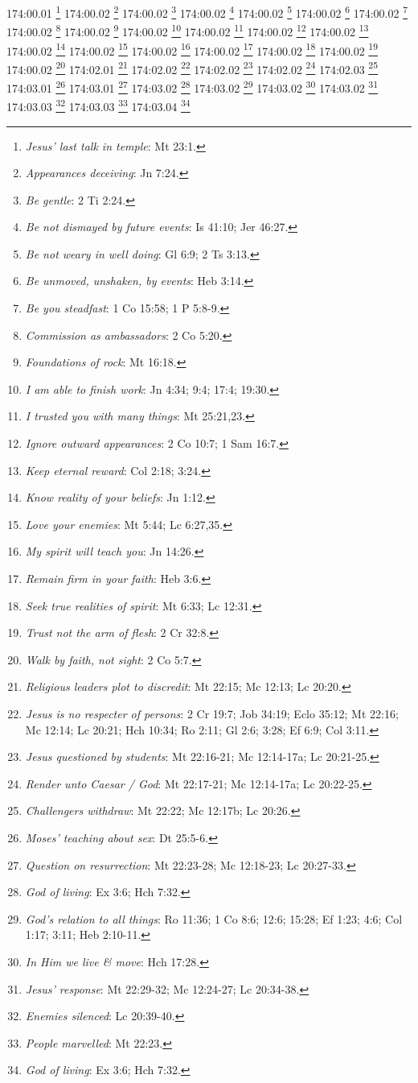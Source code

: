 174:00.01 \footnote{\textit{Jesus' last talk in temple}: Mt 23:1.}
174:00.02 \footnote{\textit{Appearances deceiving}: Jn 7:24.}
174:00.02 \footnote{\textit{Be gentle}: 2 Ti 2:24.}
174:00.02 \footnote{\textit{Be not dismayed by future events}: Is 41:10; Jer 46:27.}
174:00.02 \footnote{\textit{Be not weary in well doing}: Gl 6:9; 2 Ts 3:13.}
174:00.02 \footnote{\textit{Be unmoved, unshaken, by events}: Heb 3:14.}
174:00.02 \footnote{\textit{Be you steadfast}: 1 Co 15:58; 1 P 5:8-9.}
174:00.02 \footnote{\textit{Commission as ambassadors}: 2 Co 5:20.}
174:00.02 \footnote{\textit{Foundations of rock}: Mt 16:18.}
174:00.02 \footnote{\textit{I am able to finish work}: Jn 4:34; 9:4; 17:4; 19:30.}
174:00.02 \footnote{\textit{I trusted you with many things}: Mt 25:21,23.}
174:00.02 \footnote{\textit{Ignore outward appearances}: 2 Co 10:7; 1 Sam 16:7.}
174:00.02 \footnote{\textit{Keep eternal reward}: Col 2:18; 3:24.}
174:00.02 \footnote{\textit{Know reality of your beliefs}: Jn 1:12.}
174:00.02 \footnote{\textit{Love your enemies}: Mt 5:44; Lc 6:27,35.}
174:00.02 \footnote{\textit{My spirit will teach you}: Jn 14:26.}
174:00.02 \footnote{\textit{Remain firm in your faith}: Heb 3:6.}
174:00.02 \footnote{\textit{Seek true realities of spirit}: Mt 6:33; Lc 12:31.}
174:00.02 \footnote{\textit{Trust not the arm of flesh}: 2 Cr 32:8.}
174:00.02 \footnote{\textit{Walk by faith, not sight}: 2 Co 5:7.}
174:02.01 \footnote{\textit{Religious leaders plot to discredit}: Mt 22:15; Mc 12:13; Lc 20:20.}
174:02.02 \footnote{\textit{Jesus is no respecter of persons}: 2 Cr 19:7; Job 34:19; Eclo 35:12; Mt 22:16; Mc 12:14; Lc 20:21; Hch 10:34; Ro 2:11; Gl 2:6; 3:28; Ef 6:9; Col 3:11.}
174:02.02 \footnote{\textit{Jesus questioned by students}: Mt 22:16-21; Mc 12:14-17a; Lc 20:21-25.}
174:02.02 \footnote{\textit{Render unto Caesar / God}: Mt 22:17-21; Mc 12:14-17a; Lc 20:22-25.}
174:02.03 \footnote{\textit{Challengers withdraw}: Mt 22:22; Mc 12:17b; Lc 20:26.}
174:03.01 \footnote{\textit{Moses' teaching about sex}: Dt 25:5-6.}
174:03.01 \footnote{\textit{Question on resurrection}: Mt 22:23-28; Mc 12:18-23; Lc 20:27-33.}
174:03.02 \footnote{\textit{God of living}: Ex 3:6; Hch 7:32.}
174:03.02 \footnote{\textit{God's relation to all things}: Ro 11:36; 1 Co 8:6; 12:6; 15:28; Ef 1:23; 4:6; Col 1:17; 3:11; Heb 2:10-11.}
174:03.02 \footnote{\textit{In Him we live & move}: Hch 17:28.}
174:03.02 \footnote{\textit{Jesus' response}: Mt 22:29-32; Mc 12:24-27; Lc 20:34-38.}
174:03.03 \footnote{\textit{Enemies silenced}: Lc 20:39-40.}
174:03.03 \footnote{\textit{People marvelled}: Mt 22:23.}
174:03.04 \footnote{\textit{God of living}: Ex 3:6; Hch 7:32.}
